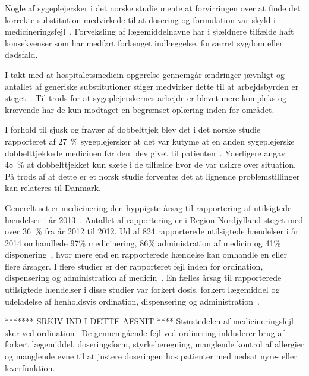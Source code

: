 Nogle af sygeplejersker i det norske studie mente at forvirringen over at finde det korrekte substitution medvirkede til at dosering og formulation var skyld i medicineringsfejl~\citep{Hakonsen2010}. Forveksling af lægemiddelnavne har i sjældnere tilfælde haft konsekvenser som har medført forlænget indlæggelse, forværret sygdom eller dødsfald.~\citep{DanskSelskabforPatientsikkerhed2009}

I takt med at hospitaletsmedicin opgørelse gennemgår ændringer jævnligt og antallet af generiske substitutioner stiger medvirker dette til at arbejdsbyrden er steget~\citep{Hakonsen2010}. Til trods for at sygeplejerskernes arbejde er blevet mere kompleks og krævende har de kun modtaget en begrænset oplæring inden for området.~\citep{Hakonsen2010}

I forhold til sjusk og fravær af dobbelttjek blev det i det norske studie rapporteret af 27~\% sygeplejersker at det var kutyme at en anden sygeplejerske dobbelttjekkede medicinen før den blev givet til patienten~\citep{Hakonsen2010}. Yderligere angav 48~\% at dobbelttjekket kun skete i de tilfælde hvor de var usikre over situation.~\citep{Hakonsen2010} På trods af at dette er et norsk studie forventes det at lignende problemstillinger kan relateres til Danmark.

Generelt set er medicinering den hyppigste årsag til rapportering af utilsigtede hændelser i år 2013~\citep{Patientombuddet2013}. Antallet af rapportering er i Region Nordjylland steget med over 36~\% fra år 2012 til 2012. Ud af 824 rapporterede utilsigtede hændelser i år 2014 omhandlede 97\% medicinering, 86\% administration af medicin og 41\% disponering~\citep{Jensen2014}, hvor mere end en rapporterede hændelse kan omhandle en eller flere årsager. I flere studier er der rapporteret fejl inden for ordination, dispensering og administration af medicin~\citep{Barker2002,Sundhedsstyrelsen2005, Lisby2005, Tully2009}. En fælles årsag til rapporterede utilsigtede hændelser i disse studier var forkert dosis, forkert lægemiddel og udeladelse af henholdsvis ordination, dispensering og administration~\citep{Barker2002,Sundhedsstyrelsen2005,Lisby2005, Tully2009}.

******* SRKIV IND I DETTE AFSNIT ****
Størstedelen af medicineringsfejl sker ved ordination~\citep{Agrawal2009,Anderson2002,Kaushal2002}
De gennemgående fejl ved ordinering inkluderer brug af forkert lægemiddel, doseringsform, styrkeberegning, manglende kontrol af allergier og manglende evne til at justere doseringen hos patienter med nedsat nyre- eller leverfunktion.~\citep{Agrawal2009}


